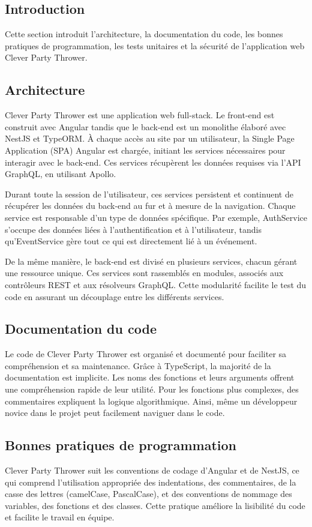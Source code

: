 \subsection{Introduction}\label{subsec:introduction}
Cette section introduit l'architecture, la documentation du code, les bonnes pratiques de programmation, les tests unitaires et la sécurité de l'application web Clever Party Thrower.

\subsection{Architecture}\label{subsec:architecture}
Clever Party Thrower est une application web full-stack.
Le front-end est construit avec Angular tandis que le back-end est un monolithe élaboré avec NestJS et TypeORM. À chaque accès au site par un utilisateur,
la Single Page Application (SPA) Angular est chargée, initiant les services nécessaires pour interagir avec le back-end.
Ces services récupèrent les données requises via l'API GraphQL, en utilisant Apollo.

Durant toute la session de l'utilisateur, ces services persistent et continuent de récupérer les données du back-end au fur et à mesure de la navigation.
Chaque service est responsable d'un type de données spécifique.
Par exemple, AuthService s'occupe des données liées à l'authentification et à l'utilisateur, tandis qu'EventService gère tout ce qui est directement lié à un événement.

De la même manière, le back-end est divisé en plusieurs services, chacun gérant une ressource unique.
Ces services sont rassemblés en modules, associés aux contrôleurs REST et aux résolveurs GraphQL. Cette modularité facilite le test du code en assurant un découplage
entre les différents services.

\subsection{Documentation du code}\label{subsec:documentation-du-code}
Le code de Clever Party Thrower est organisé et documenté pour faciliter sa compréhension et sa maintenance.
Grâce à TypeScript, la majorité de la documentation est implicite.
Les noms des fonctions et leurs arguments offrent une compréhension rapide de leur utilité.
Pour les fonctions plus complexes, des commentaires expliquent la logique algorithmique.
Ainsi, même un développeur novice dans le projet peut facilement naviguer dans le code.

\subsection{Bonnes pratiques de programmation}\label{subsec:bonnes-pratiques-de-programmation}
Clever Party Thrower suit les conventions de codage d'Angular et de NestJS, ce qui comprend l'utilisation appropriée des indentations,
des commentaires, de la casse des lettres (camelCase, PascalCase), et des conventions de nommage des variables, des fonctions et des classes.
Cette pratique améliore la lisibilité du code et facilite le travail en équipe.

